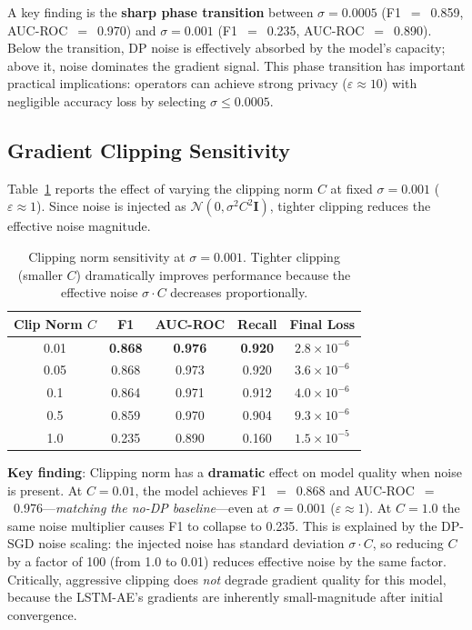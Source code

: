A key finding is the \textbf{sharp phase transition} between
$\sigma{=}0.0005$ (F1~$=$~0.859, AUC-ROC~$=$~0.970) and $\sigma{=}0.001$
(F1~$=$~0.235, AUC-ROC~$=$~0.890). Below the transition, DP noise is
effectively absorbed by the model's capacity; above it, noise dominates
the gradient signal. This phase transition has important practical
implications: operators can achieve strong privacy ($\varepsilon \approx 10$)
with negligible accuracy loss by selecting $\sigma \leq 0.0005$.

\subsection{Gradient Clipping Sensitivity}
\label{subsec:eval_clipping}

Table~\ref{tab:clip_norm} reports the effect of varying the clipping norm $C$
at fixed $\sigma{=}0.001$ ($\varepsilon \approx 1$). Since noise is injected as
$\mathcal{N}(0, \sigma^2 C^2 \mathbf{I})$, tighter clipping reduces the
effective noise magnitude.

\begin{table}[H]
    \centering
    \small
    \begin{tabular}{|c|c|c|c|c|}
        \hline
        \textbf{Clip Norm $C$} & \textbf{F1} & \textbf{AUC-ROC}
        & \textbf{Recall} & \textbf{Final Loss} \\
        \hline
        0.01 & \textbf{0.868} & \textbf{0.976} & \textbf{0.920}
        & $2.8 \times 10^{-6}$ \\
        \hline
        0.05 & 0.868 & 0.973 & 0.920 & $3.6 \times 10^{-6}$ \\
        \hline
        0.1 & 0.864 & 0.971 & 0.912 & $4.0 \times 10^{-6}$ \\
        \hline
        0.5 & 0.859 & 0.970 & 0.904 & $9.3 \times 10^{-6}$ \\
        \hline
        1.0 & 0.235 & 0.890 & 0.160 & $1.5 \times 10^{-5}$ \\
        \hline
    \end{tabular}
    \caption{Clipping norm sensitivity at $\sigma{=}0.001$. Tighter clipping
             (smaller $C$) dramatically improves performance because the
             effective noise $\sigma \cdot C$ decreases proportionally.}
    \label{tab:clip_norm}
\end{table}

\textbf{Key finding}: Clipping norm has a \textbf{dramatic} effect on model
quality when noise is present. At $C{=}0.01$, the model achieves F1~$=$~0.868
and AUC-ROC~$=$~0.976---\emph{matching the no-DP baseline}---even at
$\sigma{=}0.001$ ($\varepsilon \approx 1$). At $C{=}1.0$ the same noise
multiplier causes F1 to collapse to 0.235. This is explained by the DP-SGD
noise scaling: the injected noise has standard deviation $\sigma \cdot C$,
so reducing $C$ by a factor of 100 (from 1.0 to 0.01) reduces effective
noise by the same factor. Critically, aggressive clipping does \emph{not}
degrade gradient quality for this model, because the LSTM-AE's gradients
are inherently small-magnitude after initial convergence.


